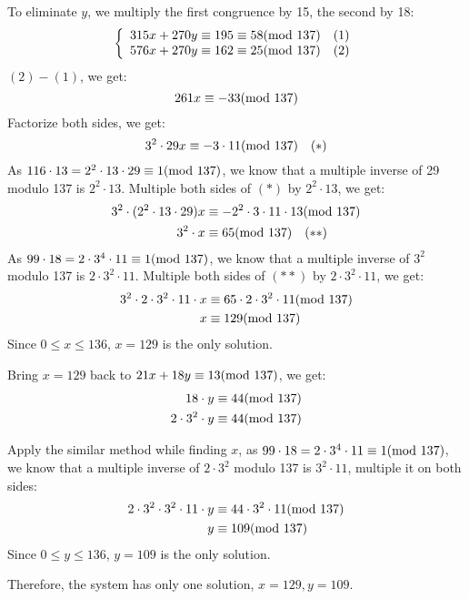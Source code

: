 \documentclass[a4paper,11pt]{article}
\begin{document}
\begin{spacing}{1.4}
    To eliminate $y$, we multiply the first congruence by 15,
    the second by 18:
    \begin{align*}
        \left\{
            \begin{array}{l}
                315x+270y\equiv 195\equiv 58 {\rm (mod\ 137)}\ \ \ (1)\\
                576x+270y\equiv 162\equiv 25 {\rm (mod\ 137)}\ \ \ (2)
            \end{array}
        \right.
    \end{align*}
    $(2)-(1)$, we get:
    $$261x\equiv -33 {\rm (mod\ 137)}$$
    Factorize both sides, we get:
    $$3^2\cdot 29x\equiv -3\cdot 11 {\rm (mod\ 137)}\ \ \ (*)$$
    As $116\cdot 13=2^2\cdot 13\cdot 29\equiv 1 {\rm (mod\ 137)}$,
    we know that a multiple inverse of 29 modulo 137 is $2^2\cdot 13$.
    Multiple both sides of $(*)$ by $2^2\cdot 13$, we get:
    \begin{align*}
        3^2\cdot (2^2\cdot 13\cdot 29)x &\equiv 
        -2^2\cdot 3\cdot 11\cdot 13 {\rm (mod\ 137)}\\
        3^2\cdot x &\equiv 65 {\rm (mod\ 137)}\ \ \ (**)
    \end{align*}
    As $99\cdot 18=2\cdot 3^4\cdot 11\equiv 1 {\rm (mod\ 137)}$,
    we know that a multiple inverse of $3^2$ modulo 137 is 
    $2\cdot 3^2\cdot 11$.
    Multiple both sides of $(**)$ by $2\cdot 3^2\cdot 11$, we get:
    \begin{align*}
        3^2\cdot 2\cdot 3^2\cdot 11\cdot x &\equiv 
        65\cdot 2\cdot 3^2\cdot 11 {\rm (mod\ 137)}\\
        x &\equiv 129 {\rm (mod\ 137)}
    \end{align*}
    Since $0\le x\le 136$, $x=129$ is the only solution.

    Bring $x=129$ back to $21x+18y\equiv 13 {\rm (mod\ 137)}$,
    we get:
    \begin{align*}
        18\cdot y &\equiv 44 {\rm (mod\ 137)}\\
        2\cdot 3^2\cdot y &\equiv 44 {\rm (mod\ 137)}
    \end{align*}

    Apply the similar method while finding $x$,
    as $99\cdot 18=2\cdot 3^4\cdot 11\equiv 1 {\rm (mod\ 137)}$,
    we know that a multiple inverse of $2\cdot 3^2$ modulo 137 is 
    $3^2\cdot 11$, multiple it on both sides:
    \begin{align*}
        2\cdot 3^2\cdot 3^2\cdot 11\cdot y &\equiv 
        44\cdot 3^2\cdot 11 {\rm (mod\ 137)}\\
        y &\equiv 109 {\rm (mod\ 137)}
    \end{align*}
    Since $0\le y\le 136$, $y=109$ is the only solution.

    Therefore, the system has only one solution,
    $x=129, y=109$.
    

    \end{spacing}
\end{document}

